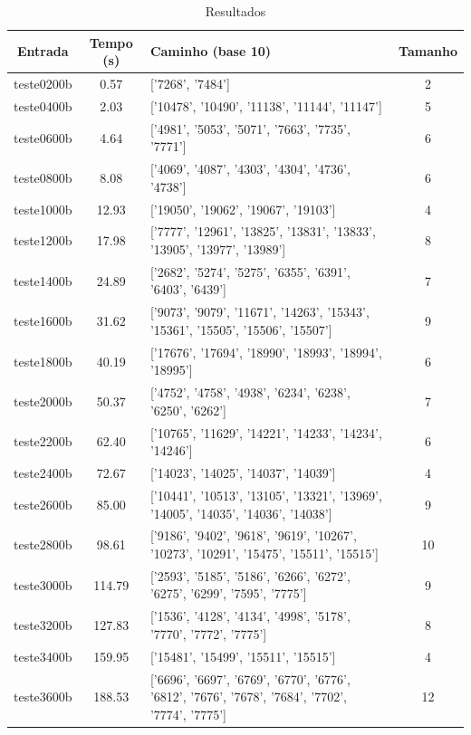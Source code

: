 \documentclass[12pt]{article}
\begin{document}
\begin{table}[h]
\caption{Resultados}
\label{tab:resultados-1}
\begin{tabular}{c | c || p{8cm} | c}
  Entrada & Tempo (s) & Caminho (base 10) & Tamanho \\
  \hline \hline
  teste0200b & 0.57 & ['7268', '7484'] & 2 \\
  \hline
  teste0400b & 2.03 & ['10478', '10490', '11138', '11144', '11147'] & 5 \\
  \hline
  teste0600b & 4.64 & ['4981', '5053', '5071', '7663', '7735', '7771'] & 6 \\
  \hline
  teste0800b & 8.08 & ['4069', '4087', '4303', '4304', '4736', '4738'] & 6 \\
  \hline
  teste1000b & 12.93 & ['19050', '19062', '19067', '19103'] & 4 \\
  \hline
  teste1200b & 17.98 & ['7777', '12961', '13825', '13831', '13833', '13905', '13977', '13989'] & 8 \\
  \hline
  teste1400b & 24.89 & ['2682', '5274', '5275', '6355', '6391', '6403', '6439'] & 7 \\
  \hline
  teste1600b & 31.62 & ['9073', '9079', '11671', '14263', '15343', '15361', '15505', '15506', '15507'] & 9 \\
  \hline
  teste1800b & 40.19 & ['17676', '17694', '18990', '18993', '18994', '18995'] & 6 \\
  \hline
  teste2000b & 50.37 & ['4752', '4758', '4938', '6234', '6238', '6250', '6262'] & 7 \\
  \hline
  teste2200b & 62.40 & ['10765', '11629', '14221', '14233', '14234', '14246'] & 6 \\
  \hline
  teste2400b & 72.67 & ['14023', '14025', '14037', '14039'] & 4 \\
  \hline
  teste2600b & 85.00 & ['10441', '10513', '13105', '13321', '13969', '14005', '14035', '14036', '14038'] & 9 \\
  \hline
  teste2800b & 98.61 & ['9186', '9402', '9618', '9619', '10267', '10273', '10291', '15475', '15511', '15515'] & 10 \\
  \hline
  teste3000b & 114.79 & ['2593', '5185', '5186', '6266', '6272', '6275', '6299', '7595', '7775'] & 9 \\
  \hline
  teste3200b & 127.83 & ['1536', '4128', '4134', '4998', '5178', '7770', '7772', '7775'] & 8 \\
  \hline
  teste3400b & 159.95 & ['15481', '15499', '15511', '15515'] & 4 \\
  \hline
  teste3600b & 188.53 & ['6696', '6697', '6769', '6770', '6776', '6812', '7676', '7678', '7684', '7702', '7774', '7775'] & 12 \\

\end{tabular}
\end{table}
\end{document}
